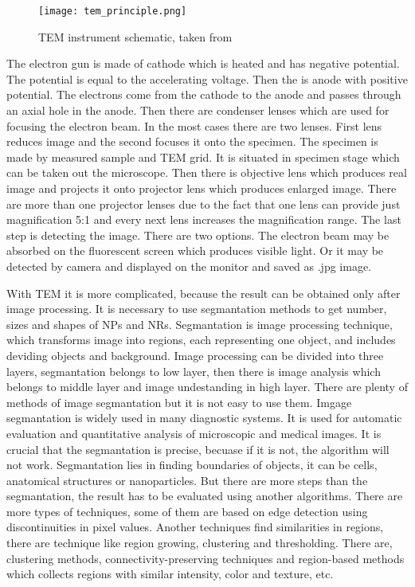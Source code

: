        \begin{figure}[h]
            \centerline{\texttt{[image: tem\_principle.png]}}
            \caption{TEM instrument schematic, taken from \cite{20}}
            \label{fig:TEM}
        \end{figure}

        The electron gun is made of cathode which is heated and has negative potential. The potential is equal to the accelerating voltage. Then the is anode with positive potential.
        The electrons come from the cathode to the anode and passes through an axial hole in the anode. Then there are condenser lenses which are used for focusing the electron beam.
        In the most cases there are two lenses. First lens reduces image and the second focuses it onto the specimen. The specimen is made by measured sample and TEM grid.
        It is situated in specimen stage which can be taken out the microscope. Then there is objective lens which produces real image and projects it onto projector lens
        which produces enlarged image. There are more than one projector lenses due to the fact that one lens can provide just magnification 5:1
        and every next lens increases the magnification range. The last step is detecting the image. There are two options. The electron beam may be absorbed on the fluorescent screen
        which produces visible light. Or it may be detected by camera and displayed on the monitor and saved as .jpg image. \cite{7}

        With TEM it is more complicated, because the result can be obtained only after image processing. It is necessary to use segmantation methods to get number, sizes and shapes of
        NPs and NRs. Segmantation is image processing technique, which transforms image into regions, each representing one object, and includes deviding objects and background.
        Image processing can be divided into three layers, segmantation belongs to low layer, then there is image analysis which belongs to middle layer and image undestanding in high layer.
        There are plenty of methods of image segmantation but it is not easy to use them. Imgage segmantation is widely used in many diagnostic systems.
        It is used for automatic evaluation and quantitative analysis of microscopic and medical images. It is crucial that the segmantation is precise, becuase if it is not,
        the algorithm will not work. Segmantation lies in finding boundaries of objects, it can be cells, anatomical structures or nanoparticles.
        But there are more steps than the segmantation, the result has to be evaluated using another algorithms. There are more types of techniques, some of them are based on
        edge detection using discontinuities in pixel values. Another techniques find similarities in regions, there are technique like region growing, clustering and thresholding.
        There are, clustering methods, connectivity-preserving techniques and region-based methods which collects regions with similar intensity, color and texture, etc. \cite{1, 2, 15, 17}

